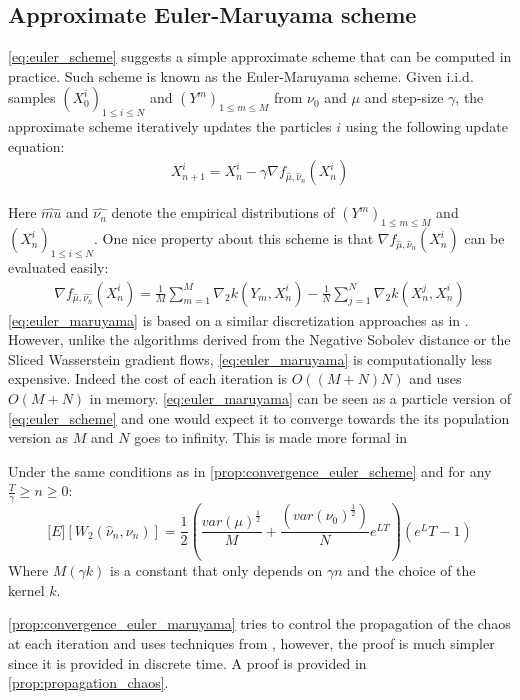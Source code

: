 \subsection{Approximate Euler-Maruyama scheme}\label{subsec:euler_maruyama}
\cref{eq:euler_scheme} suggests a simple approximate scheme that can be computed in practice. Such scheme is known as the Euler-Maruyama scheme.
Given i.i.d. samples $(X^i_0)_{1\leq i\leq N}$ and $(Y^{m})_{1\leq m\leq M}$ from $\nu_0$ and $\mu$ and step-size $\gamma$, the approximate scheme iteratively updates the particles $i$ using the following update equation: 
\begin{align}\label{eq:euler_maruyama}
	X_{n+1}^{i} = X_n^i -\gamma \nabla f_{\hat{\mu},\hat{\nu}_n}(X_n^i)
\end{align}

Here $\hat{mu}$ and $\hat{\nu_n}$ denote the empirical distributions of $(Y^{m})_{1\leq m\leq M}$ and $(X^i_n)_{1\leq i\leq N}$. One nice property about this scheme is that $\nabla f_{\hat{\mu},\hat{\nu}_n}(X_n^i)$ can be evaluated easily:
\begin{align}
	\nabla f_{\hat{\mu},\hat{\nu_n}}(X_n^i) = \frac{1}{M}\sum_{m=1}^M \nabla_2 k(Y_m,X_n^i)-\frac{1}{N}\sum_{j=1}^N \nabla_2 k(X_n^j,X_n^i)
\end{align}
\cref{eq:euler_maruyama} is based on a similar discretization approaches as in \cite{Mroueh:2019,Simsekli:2018}. However, unlike the algorithms derived from the Negative Sobolev distance or the Sliced Wasserstein gradient flows, \cref{eq:euler_maruyama} is computationally less expensive. Indeed the cost of each iteration is $O((M+N)N)$ and uses $O(M+N)$ in memory.
\cref{eq:euler_maruyama} can be seen as a particle version of \cref{eq:euler_scheme} and one would expect it to converge towards the its population version as $M$ and $N$ goes to infinity. This is made more formal in 
\begin{theorem}\label{prop:convergence_euler_maruyama}
	Under the same conditions as in \cref{prop:convergence_euler_scheme} and for any $\frac{T}{\gamma}\geq n\geq 0$:
	\begin{equation}
		\mathbb[E][W_2(\hat{\nu}_n,\nu_n)] = \frac{1}{2}(\frac{var(\mu)^\frac{1}{2}}{M} + \frac{(var(\nu_0)^\frac{1}{2})}{N}e^{LT})(e^LT-1)
	\end{equation}
	Where $M(\gamma k)$ is a constant that only depends on $\gamma n$ and the choice of the kernel $k$.
\end{theorem}
\cref{prop:convergence_euler_maruyama} tries to control the propagation of the chaos at each iteration and uses techniques from \cite{Jourdain:2007}, however, the proof is much simpler since it is provided in discrete time. A proof is provided in \cref{prop:propagation_chaos}.
